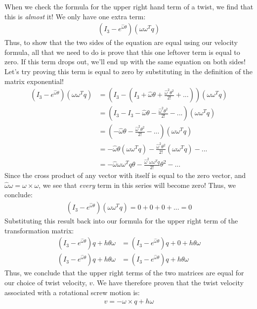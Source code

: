 \documentclass[oneside]{book}
\begin{document}
When we check the formula for the upper right hand term of a twist, we find that this is \textit{almost} it! We only have one extra term:
\begin{align}
    (I_3 - e^{\hat\omega\theta})(\omega\omega^Tq)
\end{align}
Thus, to show that the two sides of the equation are equal using our velocity formula, all that we need to do is prove that this one leftover term is equal to zero. If this term drops out, we'll end up with the same equation on both sides!\\
Let's try proving this term is equal to zero by substituting in the definition of the matrix exponential!
\begin{align}
    (I_3 - e^{\hat\omega\theta})(\omega\omega^Tq) &= (I_3 - (I_3 + \hat\omega\theta + \frac{\hat\omega^2\theta^2}{2!} + ...))(\omega\omega^Tq)\\
    &= (I_3 - I_3 - \hat\omega\theta - \frac{\hat\omega^2\theta^2}{2!} - ...)(\omega\omega^Tq)\\
    &= (-\hat\omega\theta - \frac{\hat\omega^2\theta^2}{2!} - ...)(\omega\omega^Tq)\\
    &= -\hat\omega\theta(\omega\omega^Tq) - \frac{\hat\omega^2\theta^2}{2!}(\omega\omega^Tq) - ...\\
    &= -\hat\omega\omega\omega^Tq\theta - \frac{\hat\omega^2\omega\omega^Tq}{2!} \theta^2- ...
\end{align}
Since the cross product of any vector with itself is equal to the zero vector, and $\hat\omega \omega = \omega \times \omega$, we see that \textit{every} term in this series will become zero! Thus, we conclude:
\begin{align}
    (I_3 - e^{\hat\omega\theta})(\omega\omega^Tq) = 0 + 0 + 0 + ... = 0
\end{align}
Substituting this result back into our formula for the upper right term of the transformation matrix:
\begin{align}
    (I_3 - e^{\hat\omega\theta})q + h\theta \omega &= (I_3 - e^{\hat\omega\theta})q + 0 + h\theta \omega\\
    (I_3 - e^{\hat\omega\theta})q + h\theta \omega &= (I_3 - e^{\hat\omega\theta})q + h\theta \omega
\end{align}
Thus, we conclude that the upper right terms of the two matrices are equal for our choice of twist velocity, $v$. We have therefore proven that the twist velocity associated with a rotational screw motion is:
\begin{align}
    v = -\omega \times q + h\omega
\end{align}
\end{document}
